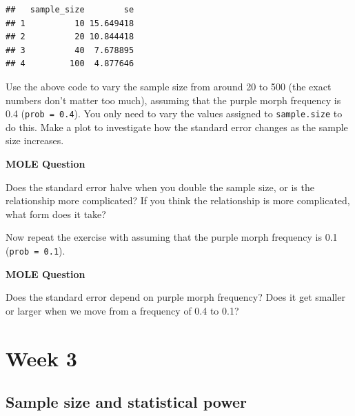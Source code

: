 \documentclass[]{book}
\newenvironment{Shaded}{\begin{snugshade}}{\end{snugshade}}
\newcommand{\KeywordTok}[1]{\textcolor[rgb]{0.13,0.29,0.53}{\textbf{{#1}}}}
\newcommand{\DataTypeTok}[1]{\textcolor[rgb]{0.13,0.29,0.53}{{#1}}}
\newcommand{\DecValTok}[1]{\textcolor[rgb]{0.00,0.00,0.81}{{#1}}}
\newcommand{\FloatTok}[1]{\textcolor[rgb]{0.00,0.00,0.81}{{#1}}}
\newcommand{\StringTok}[1]{\textcolor[rgb]{0.31,0.60,0.02}{{#1}}}
\newcommand{\NormalTok}[1]{{#1}}
\begin{document}
\begin{Shaded}
\end{Shaded}

\begin{verbatim}
##   sample_size        se
## 1          10 15.649418
## 2          20 10.844418
## 3          40  7.678895
## 4         100  4.877646
\end{verbatim}

Use the above code to vary the sample size from around 20 to 500 (the
exact numbers don't matter too much), assuming that the purple morph
frequency is 0.4 (\texttt{prob\ =\ 0.4}). You only need to vary the
values assigned to \texttt{sample.size} to do this. Make a plot to
investigate how the standard error changes as the sample size increases.

\begin{do-something}
\textbf{MOLE Question}

Does the standard error halve when you double the sample size, or is the
relationship more complicated? If you think the relationship is more
complicated, what form does it take?
\end{do-something}

Now repeat the exercise with assuming that the purple morph frequency is
0.1 (\texttt{prob\ =\ 0.1}).

\begin{do-something}
\textbf{MOLE Question}

Does the standard error depend on purple morph frequency? Does it get
smaller or larger when we move from a frequency of 0.4 to 0.1?
\end{do-something}

\section{Week 3}\label{week-3}

\subsection{Sample size and statistical
power}\label{sample-size-and-statistical-power}
\end{document}
